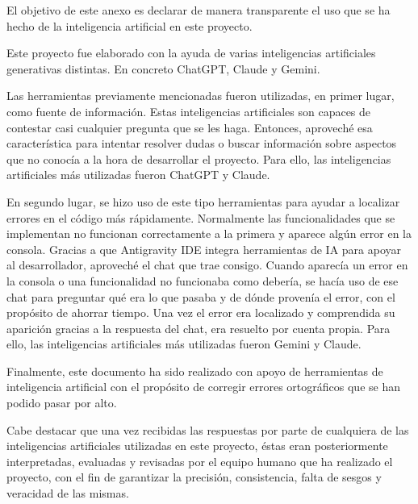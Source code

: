 \documentclass{memoriaPFC}
\begin{document}
El objetivo de este anexo es declarar de manera transparente el uso que se ha hecho de la inteligencia artificial en este proyecto.

Este proyecto fue elaborado con la ayuda de varias inteligencias artificiales generativas distintas. En concreto ChatGPT, Claude y Gemini.

Las herramientas previamente mencionadas fueron utilizadas, en primer lugar, como fuente de información. Estas inteligencias artificiales son capaces de contestar casi cualquier pregunta que se les haga. Entonces, aproveché esa característica para intentar resolver dudas o buscar información sobre aspectos que no conocía a la hora de desarrollar el proyecto. Para ello, las inteligencias artificiales más utilizadas fueron ChatGPT y Claude.

En segundo lugar, se hizo uso de este tipo herramientas para ayudar a localizar errores en el código más rápidamente. Normalmente las funcionalidades que se implementan no funcionan correctamente a la primera y aparece algún error en la consola. Gracias a que Antigravity IDE integra herramientas de IA para apoyar al desarrollador, aproveché el chat que trae consigo. Cuando aparecía un error en la consola o una funcionalidad no funcionaba como debería, se hacía uso de ese chat para preguntar qué era lo que pasaba y de dónde provenía el error, con el propósito de ahorrar tiempo. Una vez el error era localizado y comprendida su aparición gracias a la respuesta del chat, era resuelto por cuenta propia. Para ello, las inteligencias artificiales más utilizadas fueron Gemini y Claude.

Finalmente, este documento ha sido realizado con apoyo de herramientas de inteligencia artificial con el propósito de corregir errores ortográficos que se han podido pasar por alto.

Cabe destacar que una vez recibidas las respuestas por parte de cualquiera de las inteligencias artificiales utilizadas en este proyecto, éstas eran posteriormente interpretadas, evaluadas y revisadas por el equipo humano que ha realizado el proyecto, con el fin de garantizar la precisión, consistencia, falta de sesgos y veracidad de las mismas.
\end{document}
